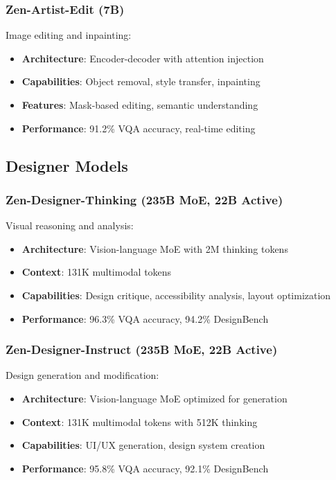 \documentclass[11pt,a4paper]{article}
\begin{document}
\subsubsection{Zen-Artist-Edit (7B)}
Image editing and inpainting:
\begin{itemize}
    \item \textbf{Architecture}: Encoder-decoder with attention injection
    \item \textbf{Capabilities}: Object removal, style transfer, inpainting
    \item \textbf{Features}: Mask-based editing, semantic understanding
    \item \textbf{Performance}: 91.2\% VQA accuracy, real-time editing
\end{itemize}

\subsection{Designer Models}

\subsubsection{Zen-Designer-Thinking (235B MoE, 22B Active)}
Visual reasoning and analysis:
\begin{itemize}
    \item \textbf{Architecture}: Vision-language MoE with 2M thinking tokens
    \item \textbf{Context}: 131K multimodal tokens
    \item \textbf{Capabilities}: Design critique, accessibility analysis, layout optimization
    \item \textbf{Performance}: 96.3\% VQA accuracy, 94.2\% DesignBench
\end{itemize}

\subsubsection{Zen-Designer-Instruct (235B MoE, 22B Active)}
Design generation and modification:
\begin{itemize}
    \item \textbf{Architecture}: Vision-language MoE optimized for generation
    \item \textbf{Context}: 131K multimodal tokens with 512K thinking
    \item \textbf{Capabilities}: UI/UX generation, design system creation
    \item \textbf{Performance}: 95.8\% VQA accuracy, 92.1\% DesignBench
\end{itemize}
\end{document}
